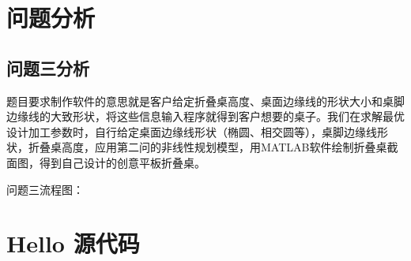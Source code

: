 \documentclass[withoutpreface,bwprint]{cumcmthesis}
\begin{document}
\section{问题分析}

\subsection{问题三分析}
题目要求制作软件的意思就是客户给定折叠桌高度、桌面边缘线的形状大小和桌脚边缘线的大致形状，将这些信息输入程序就得到客户想要的桌子。我们在求解最优设计加工参数时，自行给定桌面边缘线形状（椭圆、相交圆等），桌脚边缘线形状，折叠桌高度，应用第二问的非线性规划模型，用MATLAB软件绘制折叠桌截面图，得到自己设计的创意平板折叠桌。

问题三流程图：


\nocite{*}


\newpage
\appendix
\section{Hello 源代码}

\end{document}
